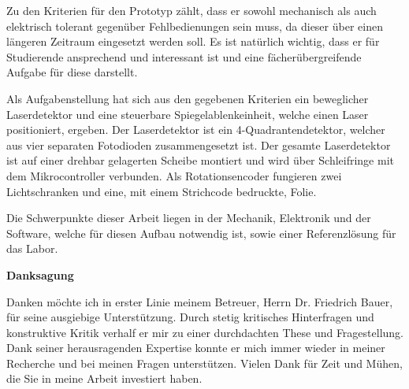 Zu den Kriterien für den Prototyp zählt, dass er sowohl mechanisch als auch elektrisch tolerant gegenüber Fehlbedienungen sein muss, da dieser über einen längeren Zeitraum eingesetzt werden soll. Es ist natürlich wichtig, dass er für Studierende ansprechend und interessant ist und eine fächerübergreifende Aufgabe für diese darstellt.

Als Aufgabenstellung hat sich aus den gegebenen Kriterien ein beweglicher Laserdetektor und eine steuerbare Spiegelablenkeinheit, welche einen Laser positioniert, ergeben. Der Laserdetektor ist ein 4-Quadrantendetektor, welcher aus vier separaten Fotodioden zusammengesetzt ist. Der gesamte Laserdetektor ist auf einer drehbar gelagerten Scheibe montiert und wird über Schleifringe mit dem Mikrocontroller verbunden. Als Rotationsencoder fungieren zwei Lichtschranken und eine, mit einem Strichcode bedruckte, Folie.

Die Schwerpunkte dieser Arbeit liegen in der Mechanik, Elektronik und der Software, welche für diesen Aufbau notwendig ist, sowie einer Referenzlösung für das Labor.

\null\vfil




\newpage
\null\vfil
\begin{center}\bf Danksagung\end{center}
Danken möchte ich in erster Linie meinem Betreuer, Herrn Dr. Friedrich Bauer, für seine ausgiebige Unterstützung. Durch stetig kritisches Hinterfragen und konstruktive Kritik verhalf er mir zu einer durchdachten These und Fragestellung. Dank seiner herausragenden Expertise konnte er mich immer wieder in meiner Recherche und bei meinen Fragen unterstützen. Vielen Dank für Zeit und Mühen, die Sie in meine Arbeit investiert haben.
\par\vfil\null
\newpage

